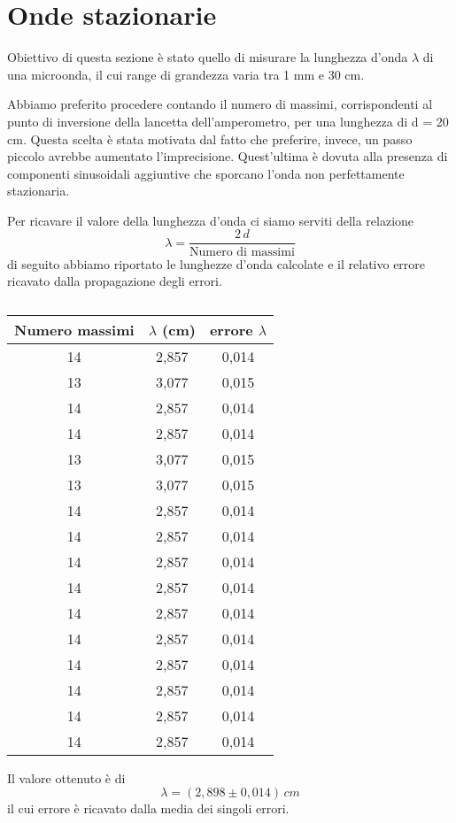 \section{Onde stazionarie}
Obiettivo di questa sezione è stato quello di misurare la lunghezza d'onda $\lambda $ di una microonda, il cui range di grandezza varia tra 1 mm e 30 cm.

Abbiamo preferito procedere contando il numero di massimi, corrispondenti al punto di inversione della lancetta dell'amperometro, per una lunghezza di d = 20 cm. Questa scelta è stata motivata dal fatto che preferire, invece, un passo piccolo avrebbe aumentato l'imprecisione. Quest'ultima è dovuta alla presenza di componenti sinusoidali aggiuntive che sporcano l'onda non perfettamente stazionaria.

Per ricavare il valore della lunghezza d'onda ci siamo serviti della relazione 
\begin{equation}
    \lambda = \dfrac{2\, d}{\text{Numero di massimi}}
\end{equation}
di seguito abbiamo riportato le lunghezze d'onda calcolate e il relativo errore ricavato dalla propagazione degli errori.

\begin{table}[h!]
    \centering
    \begin{tabular}{ccc}
        Numero massimi & $\lambda$ (cm) & errore $\lambda$\\
        \hline
    14&	2,857&	0,014\\
    13&	3,077&	0,015\\
    14&	2,857&	0,014\\
    14&	2,857&	0,014\\
    13&	3,077&	0,015\\
    13&	3,077&	0,015\\
    14&	2,857&	0,014\\
    14&	2,857&	0,014\\
    14&	2,857&	0,014\\
    14&	2,857&	0,014\\
    14&	2,857&	0,014\\
    14&	2,857&	0,014\\
    14&	2,857&	0,014\\
    14&	2,857&	0,014\\
    14&	2,857&	0,014\\
    14&	2,857&	0,014\\
\hline\hline
    \end{tabular}
    \caption{}
    \label{lunghezze donda}
\end{table}
\noindent
Il valore ottenuto è di 
$$
\lambda = (2,898 \pm 0,014)\,cm
$$
il cui errore è ricavato dalla media dei singoli errori.
